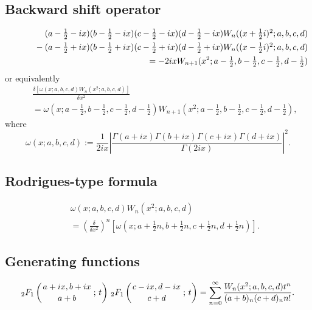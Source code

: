 \documentclass[envcountchap,graybox]{svmono}
\newcommand{\hyp}[5]{\mbox{}_{#1}{F}_{#2}
\left(\genfrac{}{}{0pt}{}{#3}{#4}\,;\,#5\right)}
\newcommand{\mathindent}{\hspace{7.5mm}}
\renewcommand{\Gamma}{\varGamma}
\begin{document}
\newpage

\subsection*{Backward shift operator}
\begin{eqnarray}
\label{shift2WilsonI}
& &(a-\textstyle\frac{1}{2}-ix)(b-\textstyle\frac{1}{2}-ix)
(c-\textstyle\frac{1}{2}-ix)(d-\textstyle\frac{1}{2}-ix)
W_n((x+\textstyle\frac{1}{2}i)^2;a,b,c,d)\nonumber\\
& &{}\mathindent{}-(a-\textstyle\frac{1}{2}+ix)(b-\textstyle\frac{1}{2}+ix)
(c-\textstyle\frac{1}{2}+ix)(d-\textstyle\frac{1}{2}+ix)
W_n((x-\textstyle\frac{1}{2}i)^2;a,b,c,d)\nonumber\\
& &{}=-2ix W_{n+1}(x^2;a-\textstyle\frac{1}{2},b-\textstyle\frac{1}{2},
c-\textstyle\frac{1}{2},d-\textstyle\frac{1}{2})
\end{eqnarray}
or equivalently
\begin{eqnarray}
\label{shift2WilsonII}
& &\frac{\delta\left[\omega(x;a,b,c,d)W_n(x^2;a,b,c,d)\right]}{\delta x^2}\nonumber\\
& &{}=\omega(x;a-\textstyle\frac{1}{2},b-\textstyle\frac{1}{2},
c-\textstyle\frac{1}{2},d-\textstyle\frac{1}{2})
W_{n+1}(x^2;a-\textstyle\frac{1}{2},b-\textstyle\frac{1}{2},c-\textstyle\frac{1}{2},d-\textstyle\frac{1}{2}),
\end{eqnarray}
where
$$\omega(x;a,b,c,d):=\frac{1}{2ix}\left|\frac{\Gamma(a+ix)\Gamma(b+ix)\Gamma(c+ix)\Gamma(d+ix)}{\Gamma(2ix)}\right|^2.$$

\subsection*{Rodrigues-type formula}
\begin{eqnarray}
\label{RodWilson}
& &\omega(x;a,b,c,d)W_n(x^2;a,b,c,d)\nonumber\\
& &{}=\left(\frac{\delta}{\delta x^2}\right)^n
\left[\omega(x;a+\textstyle\frac{1}{2}n,b+\textstyle\frac{1}{2}n,
c+\textstyle\frac{1}{2}n,d+\textstyle\frac{1}{2}n)\right].
\end{eqnarray}

\subsection*{Generating functions}
\begin{equation}
\label{GenWilson1}
\hyp{2}{1}{a+ix,b+ix}{a+b}{t}\,\hyp{2}{1}{c-ix,d-ix}{c+d}{t}=
\sum_{n=0}^{\infty}\frac{W_n(x^2;a,b,c,d)t^n}{(a+b)_n(c+d)_nn!}.
\end{equation}
\end{document}

